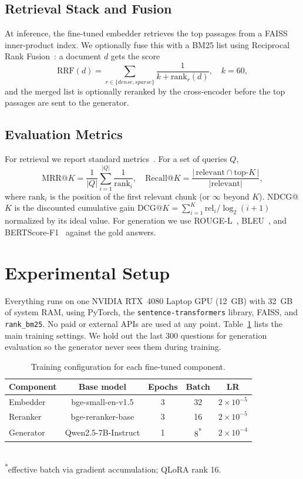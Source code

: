 \documentclass[conference]{IEEEtran}
\begin{document}
\subsection{Retrieval Stack and Fusion}
At inference, the fine-tuned embedder retrieves the top passages from a FAISS~\cite{johnson2019faiss}
inner-product index. We optionally fuse this with a BM25 list using Reciprocal Rank
Fusion~\cite{cormack2009rrf}: a document $d$ gets the score
\begin{equation}
\text{RRF}(d) = \sum_{r \in \{dense, sparse\}} \frac{1}{k + \text{rank}_r(d)}, \quad k = 60,
\end{equation}
and the merged list is optionally reranked by the cross-encoder before the top passages are sent to the
generator.

\subsection{Evaluation Metrics}
For retrieval we report standard metrics~\cite{manning2008ir}. For a set of queries $Q$,
\begin{equation}
\text{MRR@}K = \frac{1}{|Q|}\sum_{i=1}^{|Q|}\frac{1}{\text{rank}_i}, \quad
\text{Recall@}K = \frac{|\,\text{relevant} \cap \text{top-}K\,|}{|\text{relevant}|},
\end{equation}
where $\text{rank}_i$ is the position of the first relevant chunk (or $\infty$ beyond $K$). NDCG@$K$ is
the discounted cumulative gain $\text{DCG@}K = \sum_{i=1}^{K} \text{rel}_i / \log_2(i+1)$ normalized by
its ideal value. For generation we use ROUGE-L~\cite{lin2004rouge}, BLEU~\cite{papineni2002bleu}, and
BERTScore-F1~\cite{zhang2020bertscore} against the gold answers.

\section{Experimental Setup}
Everything runs on one NVIDIA RTX~4080 Laptop GPU (12~GB) with 32~GB of system RAM, using PyTorch,
the \texttt{sentence-transformers} library, FAISS, and \texttt{rank\_bm25}. No paid or external APIs are
used at any point. Table~\ref{tab:hyper} lists the main training settings. We hold out the last 300
questions for generation evaluation so the generator never sees them during training.

\begin{table}[t]
\caption{Training configuration for each fine-tuned component.}
\label{tab:hyper}
\centering
\small
\begin{tabular}{lcccc}
\toprule
Component & Base model & Epochs & Batch & LR \\
\midrule
Embedder & bge-small-en-v1.5 & 3 & 32 & $2\!\times\!10^{-5}$ \\
Reranker & bge-reranker-base & 3 & 16 & $2\!\times\!10^{-5}$ \\
Generator & Qwen2.5-7B-Instruct & 1 & 8\textsuperscript{*} & $2\!\times\!10^{-4}$ \\
\bottomrule
\end{tabular}
\\[2pt]
\footnotesize{\textsuperscript{*}effective batch via gradient accumulation; QLoRA rank 16.}
\end{table}
\end{document}

